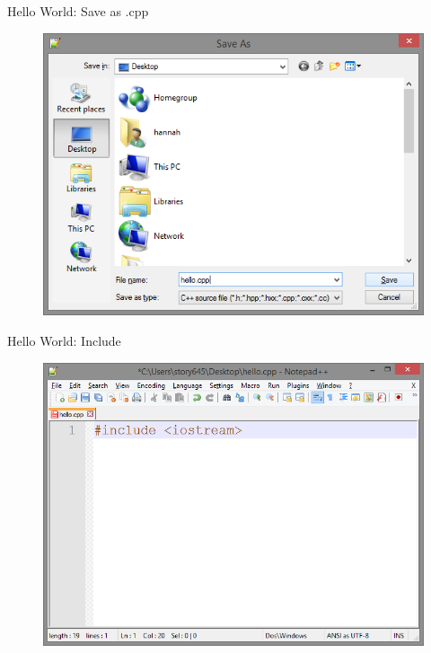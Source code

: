 \documentclass[xcolor={dvipsnames}]{beamer}
\begin{document}
\begin{frame}{Hello World: Save as .cpp}
	\begin{figure}
			\includegraphics[width=1\textwidth]{initsave}
	\end{figure}
\end{frame}
\begin{frame}{Hello World: Include}
	\begin{figure}
			\includegraphics[width=1\textwidth]{include}
	\end{figure}
\end{frame}
\end{document}
